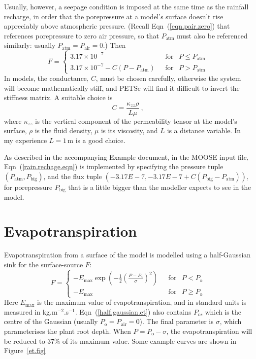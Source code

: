 \documentclass[]{scrreprt}
\begin{document}
Usually, however, a seepage condition is imposed at the same time as
the rainfall recharge, in order that the porepressure at a model's
surface doesn't rise appreciably above atmospheric pressure.  (Recall
Eqn~(\ref{eqn.pair.zero}) that references porepressure to zero air
pressure, so that $P_{\mathrm{atm}}$ must also be referenced
similarly: usually $P_{\mathrm{atm}} = P_{\mathrm{air}} = 0$.) Then
\begin{equation}
F = \left\{
\begin{array}{ll}
3.17\times 10^{-7} & \ \ \ \mbox{for }\ \ P\leq P_{\mathrm{atm}} \\
3.17\times 10^{-7} - C(P-P_{\mathrm{atm}}) & \ \ \ \mbox{for }\ \ P >
P_{\mathrm{atm}}
\end{array}
\right.
\label{rain.rechage.eqn}
\end{equation}
In models, the conductance, $C$, must be chosen carefully, otherwise
the system will become mathematically stiff, and PETSc will find it
difficult to invert the stiffness matrix.  A suitable choice is
\begin{equation}
C = \frac{\kappa_{zz}\rho}{L\mu} \ ,
\label{cond.typical.eqn}
\end{equation}
where $\kappa_{zz}$ is the vertical component of the permeability
tensor at the model's surface, $\rho$ is the fluid density, $\mu$
is its viscosity, and $L$ is a distance variable.  In my experience
$L=1$\,m is a good choice.

As described in the accompanying Example document, in the MOOSE input
file, Eqn~(\ref{rain.rechage.eqn}) is implemented by specifying the
pressure tuple $(P_{\mathrm{atm}}, P_{\mathrm{big}})$, and the flux
tuple $(-3.17E-7, -3.17E-7 + C(P_{\mathrm{big}}-P_{\mathrm{atm}}))$,
for porepressure $P_{\mathrm{big}}$ that is a little bigger than the
modeller expects to see in the model.

\section{Evapotranspiration}

Evapotranspiration from a surface of the model is modelled using a
half-Gaussian sink for the surface-source $F$:
\begin{equation}
F = \left\{
\begin{array}{ll}
-E_{\mathrm{max}} \exp\left(
-\frac{1}{2}\left(\frac{P-P_{\mathrm{o}}}{\sigma}\right)^{2} \right) &
\ \ \ \mbox{for } \ \ P<P_{\mathrm{o}} \\
-E_{\mathrm{max}} & \ \ \ \mbox{for } \ \ P\geq P_{\mathrm{o}}
\end{array}
\right.
\label{half.gaussian.et}
\end{equation}
Here $E_{\mathrm{max}}$ is the maximum value of evapotranspiration,
and in standard units is measured in kg.m$^{-2}$.s$^{-1}$.
Eqn~(\ref{half.gaussian.et}) also contains $P_{\mathrm{o}}$, which is the centre
of the Gaussian (usually $P_{\mathrm{o}}=P_{\mathrm{air}}=0$).  The final parameter is $\sigma$, which
parameterises the plant root depth.  When $P = P_{\mathrm{o}} - \sigma$, the
evapotranspiration will be reduced to 37\% of its maximum value.  Some
example curves are shown in Figure~\ref{et.fig}
\end{document}
